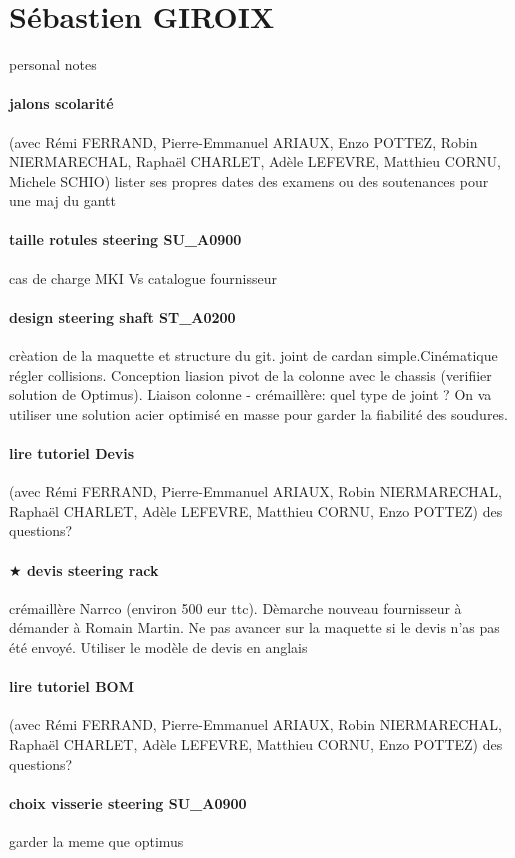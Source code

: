  
 \newpage \section*{Sébastien GIROIX} 
 \par personal notes
\paragraph{jalons scolarité} (avec Rémi FERRAND, Pierre-Emmanuel ARIAUX, Enzo POTTEZ, Robin NIERMARECHAL, Raphaël CHARLET, Adèle LEFEVRE, Matthieu CORNU, Michele SCHIO) lister ses propres dates des examens ou des soutenances pour une maj du gantt
\paragraph{taille rotules steering SU\_A0900} cas de charge MKI Vs catalogue fournisseur
\paragraph{design steering shaft ST\_A0200} crèation de la maquette et structure du git. joint de cardan simple.Cinématique régler collisions. Conception liasion pivot de la colonne avec le chassis (verifiier solution de Optimus). Liaison colonne - crémaillère: quel type de joint ? On va utiliser une solution acier optimisé en masse pour garder la fiabilité des soudures.
\paragraph{lire tutoriel Devis} (avec Rémi FERRAND, Pierre-Emmanuel ARIAUX, Robin NIERMARECHAL, Raphaël CHARLET, Adèle LEFEVRE, Matthieu CORNU, Enzo POTTEZ) des questions?
\paragraph{$\bigstar$ devis steering rack} crémaillère Narrco (environ 500 eur ttc). Dèmarche nouveau fournisseur à démander à Romain Martin. Ne pas avancer sur la maquette si le devis n'as pas été envoyé. Utiliser le modèle de devis en anglais
\paragraph{lire tutoriel BOM} (avec Rémi FERRAND, Pierre-Emmanuel ARIAUX, Robin NIERMARECHAL, Raphaël CHARLET, Adèle LEFEVRE, Matthieu CORNU, Enzo POTTEZ) des questions?
\paragraph{choix visserie steering SU\_A0900} garder la meme que optimus
